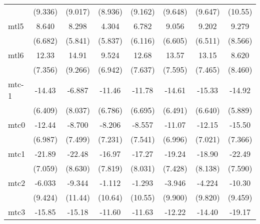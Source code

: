 \documentclass{article}
\begin{document}
{\begin{longtable}{l*{7}{c}}
                &  (9.336)         &  (9.017)         &  (8.936)         &  (9.162)         &  (9.648)         &  (9.647)         &  (10.55)         \\
mtl5            &    8.640         &    8.298         &    4.304         &    6.782         &    9.056         &    9.202         &    9.279         \\
                &  (6.682)         &  (5.841)         &  (5.837)         &  (6.116)         &  (6.605)         &  (6.511)         &  (8.566)         \\
mtl6            &    12.33         &    14.91         &    9.524         &    12.68         &    13.57         &    13.15         &    8.620         \\
                &  (7.356)         &  (9.266)         &  (6.942)         &  (7.637)         &  (7.595)         &  (7.465)         &  (8.460)         \\
mtc-1           &   -14.43\sym{*}  &   -6.887         &   -11.46         &   -11.78         &   -14.61\sym{*}  &   -15.33\sym{*}  &   -14.92\sym{*}  \\
                &  (6.409)         &  (8.037)         &  (6.786)         &  (6.695)         &  (6.491)         &  (6.640)         &  (5.889)         \\
mtc0            &   -12.44         &   -8.700         &   -8.206         &   -8.557         &   -11.07         &   -12.15         &   -15.50\sym{*}  \\
                &  (6.987)         &  (7.499)         &  (7.231)         &  (7.541)         &  (6.996)         &  (7.021)         &  (7.366)         \\
mtc1            &   -21.89\sym{**} &   -22.48\sym{*}  &   -16.97\sym{*}  &   -17.27\sym{*}  &   -19.24\sym{*}  &   -18.90\sym{*}  &   -22.49\sym{**} \\
                &  (7.059)         &  (8.630)         &  (7.819)         &  (8.031)         &  (7.428)         &  (8.138)         &  (7.590)         \\
mtc2            &   -6.033         &   -9.344         &   -1.112         &   -1.293         &   -3.946         &   -4.224         &   -10.30         \\
                &  (9.424)         &  (11.44)         &  (10.64)         &  (10.55)         &  (9.900)         &  (9.820)         &  (9.459)         \\
mtc3            &   -15.85\sym{*}  &   -15.18         &   -11.60         &   -11.63         &   -12.22         &   -14.40\sym{*}  &   -19.17\sym{*}  \\

\end{longtable}}
\end{document}
